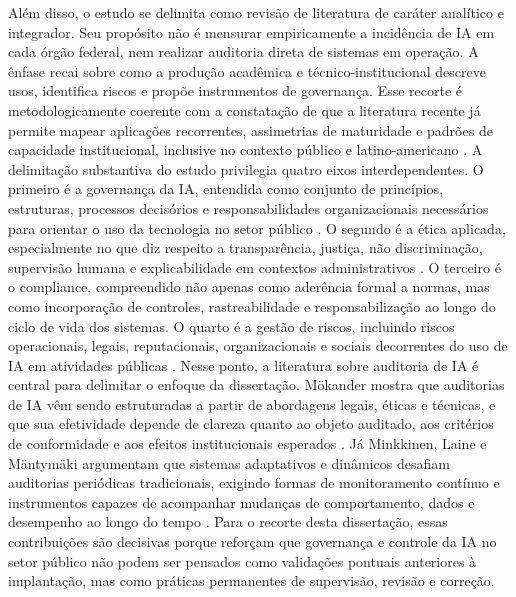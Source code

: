 \documentclass[12pt,a4paper]{article}
\begin{document}
Além disso, o estudo se delimita como revisão de literatura de caráter analítico e integrador. Seu propósito não é mensurar empiricamente a incidência de IA em cada órgão federal, nem realizar auditoria direta de sistemas em operação. A ênfase recai sobre como a produção acadêmica e técnico-institucional descreve usos, identifica riscos e propõe instrumentos de governança. Esse recorte é metodologicamente coerente com a constatação de que a literatura recente já permite mapear aplicações recorrentes, assimetrias de maturidade e padrões de capacidade institucional, inclusive no contexto público e latino-americano \autocite{mariano2026inteligencia} \autocite{goulart2025processos} \autocite{criado2024inteligencia}.
A delimitação substantiva do estudo privilegia quatro eixos interdependentes. O primeiro é a governança da IA, entendida como conjunto de princípios, estruturas, processos decisórios e responsabilidades organizacionais necessários para orientar o uso da tecnologia no setor público \autocite{sigfrids2022how}. O segundo é a ética aplicada, especialmente no que diz respeito a transparência, justiça, não discriminação, supervisão humana e explicabilidade em contextos administrativos \autocite{brkan2020legal} \autocite{sigfrids2022how}. O terceiro é o compliance, compreendido não apenas como aderência formal a normas, mas como incorporação de controles, rastreabilidade e responsabilização ao longo do ciclo de vida dos sistemas. O quarto é a gestão de riscos, incluindo riscos operacionais, legais, reputacionais, organizacionais e sociais decorrentes do uso de IA em atividades públicas \autocite{batool2025ai} \autocite{pi2021machine}.
Nesse ponto, a literatura sobre auditoria de IA é central para delimitar o enfoque da dissertação. Mökander mostra que auditorias de IA vêm sendo estruturadas a partir de abordagens legais, éticas e técnicas, e que sua efetividade depende de clareza quanto ao objeto auditado, aos critérios de conformidade e aos efeitos institucionais esperados \autocite{mkander2023auditing}. Já Minkkinen, Laine e Mäntymäki argumentam que sistemas adaptativos e dinâmicos desafiam auditorias periódicas tradicionais, exigindo formas de monitoramento contínuo e instrumentos capazes de acompanhar mudanças de comportamento, dados e desempenho ao longo do tempo \autocite{minkkinen2022continuous}. Para o recorte desta dissertação, essas contribuições são decisivas porque reforçam que governança e controle da IA no setor público não podem ser pensados como validações pontuais anteriores à implantação, mas como práticas permanentes de supervisão, revisão e correção.
\end{document}
